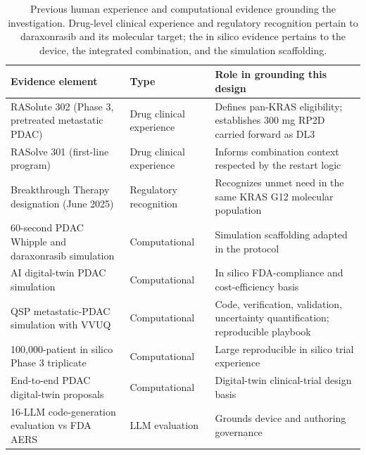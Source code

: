 \begin{table}[t]
\caption{Previous human experience and computational evidence grounding the
investigation. Drug-level clinical experience and regulatory recognition pertain to
daraxonrasib and its molecular target; the in silico evidence pertains to the
device, the integrated combination, and the simulation scaffolding.}
\label{tab:sec02-evidence}
\centering
\begin{tabularx}{\textwidth}{L{4.0cm} L{3.0cm} Y}
\toprule
\textbf{Evidence element} & \textbf{Type} & \textbf{Role in grounding this design} \\
\midrule
RASolute 302 (Phase 3, pretreated metastatic PDAC) & Drug clinical experience & Defines pan-KRAS eligibility; establishes 300 mg RP2D carried forward as DL3 \\
RASolve 301 (first-line program) & Drug clinical experience & Informs combination context respected by the restart logic \\
Breakthrough Therapy designation (June 2025) & Regulatory recognition & Recognizes unmet need in the same KRAS G12 molecular population \\
60-second PDAC Whipple and daraxonrasib simulation & Computational & Simulation scaffolding adapted in the protocol \\
AI digital-twin PDAC simulation \cite{fdadigtwinpc} & Computational & In silico FDA-compliance and cost-efficiency basis \\
QSP metastatic-PDAC simulation with VVUQ \cite{qspmetpancre} & Computational & Code, verification, validation, uncertainty quantification; reproducible playbook \\
100{,}000-patient in silico Phase 3 triplicate \cite{chatgpt100kp} & Computational & Large reproducible in silico trial experience \\
End-to-end PDAC digital-twin proposals \cite{pdacdigtwinp} & Computational & Digital-twin clinical-trial design basis \\
16-LLM code-generation evaluation vs FDA AERS \cite{llmcomp16fda} & LLM evaluation & Grounds device and authoring governance \\
\bottomrule
\end{tabularx}
\end{table}


